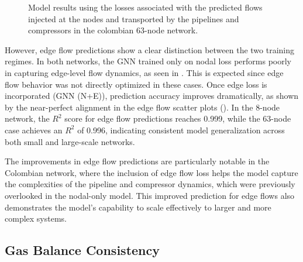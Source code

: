 \begin{figure}
    \centering
        \setlength{}        
        \setlength{} 
        \caption{Model results using the losses associated with the predicted flows injected at the nodes and transported by the pipelines and compressors in the colombian 63-node network.}
        \label{fig:col_base_f_results}
\end{figure}


However, edge flow predictions show a clear distinction between the two training regimes. In both networks, the GNN trained only on nodal loss performs poorly in capturing edge-level flow dynamics, as seen in . This is expected since edge flow behavior was not directly optimized in these cases. Once edge loss is incorporated (GNN (N+E)), prediction accuracy improves dramatically, as shown by the near-perfect alignment in the edge flow scatter plots (). In the 8-node network, the $R^2$ score for edge flow predictions reaches 0.999, while the 63-node case achieves an $R^2$ of 0.996, indicating consistent model generalization across both small and large-scale networks.

The improvements in edge flow predictions are particularly notable in the Colombian network, where the inclusion of edge flow loss helps the model capture the complexities of the pipeline and compressor dynamics, which were previously overlooked in the nodal-only model. This improved prediction for edge flows also demonstrates the model's capability to scale effectively to larger and more complex systems.

\subsection{Gas Balance Consistency}

